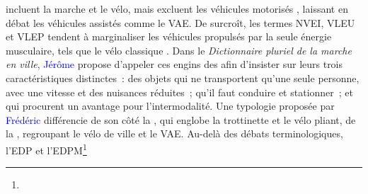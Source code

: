 \begin{refsegment}
{} incluent la marche et le vélo, mais excluent les véhicules motorisés \textcolor{blue}{\autocite[555]{adam_mobilite_2020}}, laissant en débat les véhicules assistés comme le \acrshort{VAE}. De surcroît, les termes \acrfull{NVEI}, \acrfull{VLEU} et \acrfull{VLEP} tendent à marginaliser les véhicules propulsés par la seule énergie musculaire, tels que le vélo classique \textcolor{blue}{\autocite[4]{pages_nouveaux_2021}}. Dans le \textsl{Dictionnaire pluriel de la marche en ville}, \textcolor{blue}{Jérôme} \textcolor{blue}{\textcite[233]{demailly_micro-vehicules_2021}} propose d'appeler ces engins des  afin d'insister sur leurs trois caractéristiques distinctes~: des objets qui ne transportent qu'une seule personne, avec une vitesse et des nuisances réduites~; qu'il faut conduire et stationner~; et qui procurent un avantage pour l'intermodalité. Une typologie proposée par \textcolor{blue}{Frédéric} \textcolor{blue}{\textcite[40]{heran_nouvelles_2018}} différencie de son côté la , qui englobe la trottinette et le vélo pliant, de la , regroupant le vélo de ville et le \acrshort{VAE}. Au-delà des débats terminologiques, l'\acrfull{EDP} et l'\acrfull{EDPM}\footnote{
}
\end{refsegment}
